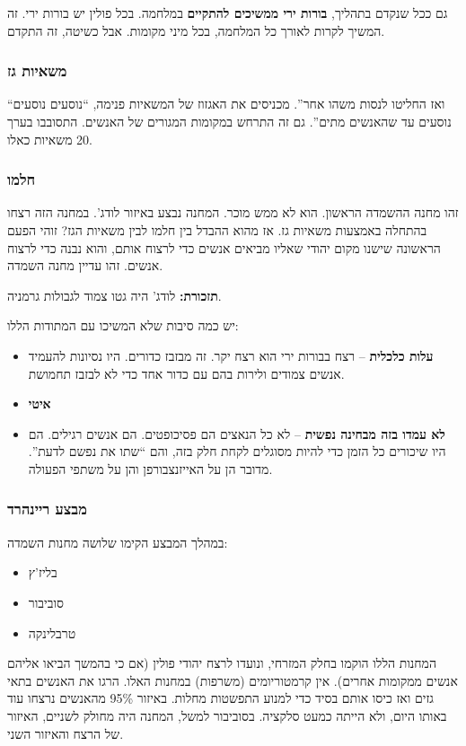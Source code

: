 \documentclass[]{article}
\theoremstyle{definition}
\begin{document}
	גם ככל שנקדם בתהליך, \textbf{בורות ירי ממשיכים להתקיים} במלחמה. בכל פולין יש בורות ירי. זה המשיך לקרות לאורך כל המלחמה, בכל מיני מקומות. אבל כשיטה, זה התקדם. 
	
	\subsubsection{משאיות גז}
	``ואז החליטו לנסות משהו אחר''. מכניסים את האגזוז של המשאיות פנימה, ``נוסעים נוסעים נוסעים עד שהאנשים מתים''. גם זה התרחש במקומות המגורים של האנשים. התסובבו בערך 20 משאיות כאלו. 
	
	\subsubsection{חלמו}
	זהו מחנה ההשמדה הראשון. הוא לא ממש מוכר. המחנה נבצע באיזור לודג'. במחנה הזה רצחו בהתחלה באמצעות משאיות גז. אז מהוא ההבדל בין חלמו לבין משאיות הגז? זוהי הפעם הראשונה שישנו מקום יהודי שאליו מביאים אנשים כדי לרצוח אותם, והוא נבנה כדי לרצוח אנשים. זהו עדיין מחנה השמדה. 
	
	\textbf{תזכורת: }לודג' היה גטו צמוד לגבולות גרמניה. 
	
	יש כמה סיבות שלא המשיכו עם המתודות הללו: 
	\begin{itemize}
		\item \textbf{עלות כלכלית} – רצח בבורות ירי הוא רצח יקר. זה מבזבז כדורים. היו נסיונות להעמיד אנשים צמודים ולירות בהם עם כדור אחד כדי לא לבזבז תחמושת. 
		\item \textbf{איטי}
		\item \textbf{לא עמדו בזה מבחינה נפשית} – לא כל הנאצים הם פסיכופטים. הם אנשים רגילים. הם היו שיכורים כל הזמן כדי להיות מסוגלים לקחת חלק בזה, והם ``שתו את נפשם לדעת''. מדובר הן על האייזנצבורפן והן על משתפי הפעולה. 
	\end{itemize}
	
	\subsubsection{מבצע ריינהרד}
	במהלך המבצע הקימו שלושה מחנות השמדה: 
	\begin{itemize}
		\item בליז'ץ
		\item סוביבור
		\item טרבלינקה
	\end{itemize}
	המחנות הללו הוקמו בחלק המזרחי, ונועדו לרצח יהודי פולין (אם כי בהמשך הביאו אליהם אנשים ממקומות אחרים). אין קרמטוריומים (משרפות) במחנות האלו. הרגו את האנשים בתאי גזים ואז כיסו אותם בסיד כדי למנוע התפשטות מחלות. באיזור 95\% מהאנשים נרצחו עוד באותו היום, ולא הייתה כמעט סלקציה. בסוביבור למשל, המחנה היה מחולק לשניים, האיזור של הרצח והאיזור השני. 
	
\end{document}
